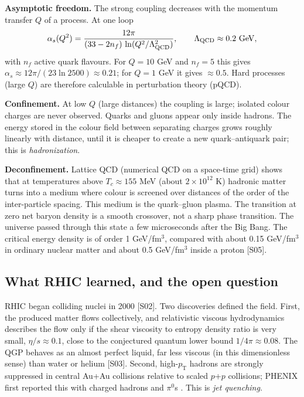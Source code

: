 \documentclass[11pt,letterpaper]{article}
\newcommand{\pT}{p_{\mathrm{T}}}
\begin{document}
\textbf{Asymptotic freedom.} The strong coupling decreases with the momentum transfer $Q$ of a process. At one loop
\begin{equation}
\alpha_s(Q^2)=\frac{12\pi}{(33-2n_f)\,\ln(Q^2/\Lambda_{\rm QCD}^2)},\qquad \Lambda_{\rm QCD}\approx 0.2\ \mathrm{GeV},
\label{eq:alphas}
\end{equation}
with $n_f$ active quark flavours. For $Q=10$ GeV and $n_f=5$ this gives $\alpha_s\approx 12\pi/(23\ln 2500)\approx 0.21$;
for $Q=1$ GeV it gives $\approx 0.5$. Hard processes (large $Q$) are therefore calculable in perturbation theory (pQCD).

\textbf{Confinement.} At low $Q$ (large distances) the coupling is large; isolated colour charges are never observed.
Quarks and gluons appear only inside hadrons. The energy stored in the colour field between separating charges grows
roughly linearly with distance, until it is cheaper to create a new quark--antiquark pair; this is \emph{hadronization}.

\textbf{Deconfinement.} Lattice QCD (numerical QCD on a space-time grid) shows that at temperatures above
$T_c\approx 155$ MeV (about $2\times10^{12}$ K) hadronic matter turns into a medium where colour is screened over
distances of the order of the inter-particle spacing. This medium is the quark--gluon plasma. The transition at zero net
baryon density is a smooth crossover, not a sharp phase transition. The universe passed through this state a few
microseconds after the Big Bang. The critical energy density is of order 1 GeV/fm$^3$, compared with about 0.15
GeV/fm$^3$ in ordinary nuclear matter and about 0.5 GeV/fm$^3$ inside a proton [S05].

\subsection{What RHIC learned, and the open question}
RHIC began colliding nuclei in 2000 [S02]. Two discoveries defined the field. First, the produced matter flows
collectively, and relativistic viscous hydrodynamics describes the flow only if the shear viscosity to entropy
density ratio is very small, $\eta/s\approx0.1$, close to the conjectured quantum lower bound $1/4\pi\approx0.08$.
The QGP behaves as an almost perfect liquid, far less viscous (in this dimensionless sense) than water or helium [S03].
Second, high-$\pT$ hadrons are strongly suppressed in central Au+Au collisions relative to scaled $p$+$p$ collisions;
PHENIX first reported this with charged hadrons and $\pi^0$s \cite{phenixsupp,phenixwp}. This is \emph{jet quenching}.
\end{document}
